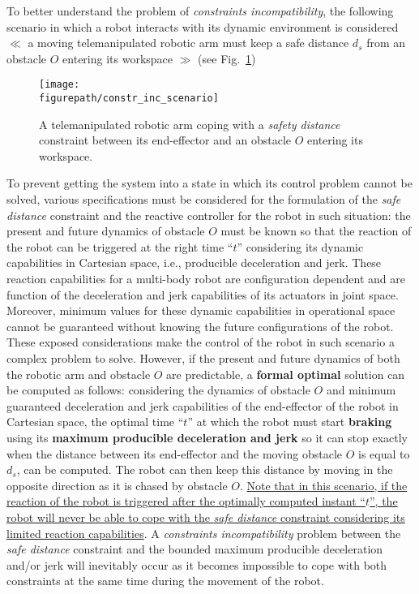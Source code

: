 To better understand the problem of \textit{constraints incompatibility}, the following scenario in which a robot interacts with its dynamic environment is considered $\ll$ a moving telemanipulated robotic arm must keep a safe distance $d_{s}$ from an obstacle $O$ entering its \allowbreak workspace $\allowbreak \gg$ (see Fig.~\ref{fig:dampdzdl})
\begin{figure}[H]
\captionsetup{width=.99\linewidth}
\centering
\texttt{[image: \\figurepath/constr\_inc\_scenario]}
\caption{A telemanipulated robotic arm coping with a \textit{safety distance} constraint between its end-effector and an obstacle $O$ entering its workspace.}
\label{fig:dampdzdl}
\end{figure}
To prevent getting the system into a state in which its control problem cannot be solved, various specifications must be considered for the formulation of the \textit{safe distance} constraint and the reactive controller for the robot in such situation: the present and future dynamics of obstacle $O$ must be known so that the reaction of the robot can be triggered at the right time ``$t$'' considering its dynamic capabilities  in Cartesian space, i.e., producible deceleration and jerk. These reaction capabilities for a multi-body robot are configuration dependent and are function of the deceleration and jerk capabilities of its actuators in joint space. Moreover, minimum values for these dynamic capabilities in operational space cannot be guaranteed without knowing the future configurations of the robot. \\
These exposed considerations make the control of the robot in such scenario a complex problem to solve. However, if the present and future dynamics of both the robotic arm and obstacle $O$ are predictable, a \textbf{formal optimal} solution can be computed as follows: considering the dynamics of obstacle $O$ and minimum guaranteed deceleration and jerk capabilities of the end-effector of the robot in Cartesian space, the optimal time ``$t$'' at which the robot must start \textbf{braking} using its \textbf{maximum producible deceleration and jerk} so it can stop exactly when the distance between its end-effector and the moving obstacle $O$ is equal to $d_{s}$, can be computed. The robot can then keep this distance by moving in the opposite direction as it is chased by obstacle $O$. \ul{Note that in this scenario, if the reaction of the robot is triggered after the optimally computed instant ``$t$'', the robot will never be able to cope with the \textit{safe distance} constraint considering its limited reaction capabilities}. A \textit{constraints incompatibility} problem between the \textit{safe distance} constraint and the bounded maximum producible deceleration and/or jerk will inevitably occur as it becomes impossible to cope with both constraints at the same time during the movement of the robot. 

